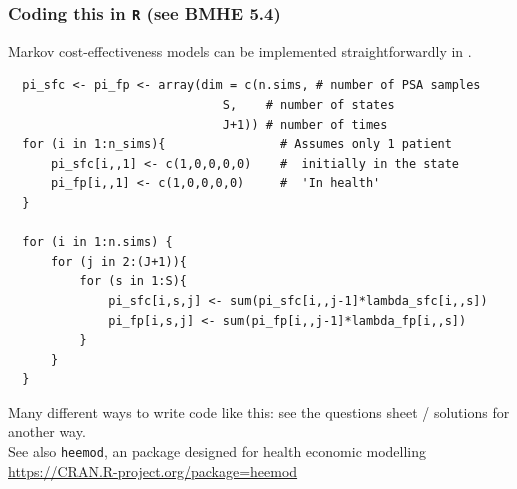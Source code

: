 




\begin{frame}[fragile]
\frametitle{Coding this in \texttt{R} \small{(see BMHE 5.4)}}

Markov cost-effectiveness models can be implemented straightforwardly in \R. 

{\footnotesize \olive
\begin{verbatim}
  pi_sfc <- pi_fp <- array(dim = c(n.sims, # number of PSA samples 
                              S,    # number of states 
                              J+1)) # number of times 
  for (i in 1:n_sims){                # Assumes only 1 patient
      pi_sfc[i,,1] <- c(1,0,0,0,0)    #  initially in the state 
      pi_fp[i,,1] <- c(1,0,0,0,0)     #  'In health'
  }

  for (i in 1:n.sims) {
      for (j in 2:(J+1)){
          for (s in 1:S){
              pi_sfc[i,s,j] <- sum(pi_sfc[i,,j-1]*lambda_sfc[i,,s])
              pi_fp[i,s,j] <- sum(pi_fp[i,,j-1]*lambda_fp[i,,s])
          }
      }
  }
\end{verbatim}
  

}

Many different ways to write code like this: see the questions sheet / solutions for another way. \\

See also \texttt{heemod}, an \R package designed for health economic modelling \url{https://CRAN.R-project.org/package=heemod}

\end{frame}

